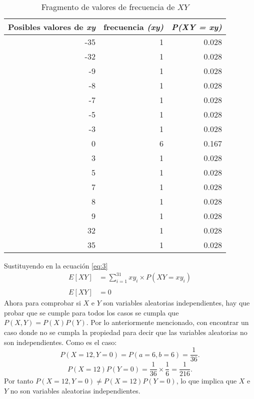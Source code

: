 \documentclass{article}
\begin{document}
\begin{table}[H]
  \centering
  \caption{Fragmento de valores de frecuencia de $XY$}
    \begin{tabular}{rrr}
    \toprule
    \multicolumn{1}{p{5.39em}}{\textbf{Posibles valores de \textit{\textbf{xy}}}} & \multicolumn{1}{l}{\textbf{frecuencia  \textit{\textbf{(xy)}}}}  & \multicolumn{1}{l}{\textit{\textbf{P(XY = xy)}}} \\
    \midrule
    -35   & 1     & 0.028 \\
    -32   & 1     & 0.028 \\
    -9    & 1     & 0.028 \\
    -8    & 1     & 0.028 \\
    -7    & 1     & 0.028 \\
    -5    & 1     & 0.028 \\
    -3    & 1     & 0.028 \\
    0     & 6     & 0.167 \\
    3     & 1     & 0.028 \\
    5     & 1     & 0.028 \\
    7     & 1     & 0.028 \\
    8     & 1     & 0.028 \\
    9     & 1     & 0.028 \\
    32    & 1     & 0.028 \\
    35    & 1     & 0.028 \\
    \bottomrule
    \end{tabular}%
  \label{tab:3}%
\end{table}%
Sustituyendo en la ecuación \ref{eq:3}
\begin{equation}
\begin{array}{ll}
   E[XY] &= \sum_{i=1}^{31} xy_{i}  \times P(XY=xy_{i})\\
   &\\
   E[XY] & = 0
  \end{array}
\end{equation}
Ahora para comprobar si $X$ e $Y$ son variables aleatorias independientes, hay que probar que se cumple para todos los casos se cumpla que $P(X,Y) = P(X)P(Y)$. Por lo anteriormente mencionado, con encontrar un caso donde no se cumpla la propiedad para decir que las variables aleatorias no son independientes. Como es el caso:
\begin{equation}
 P(X=12,Y=0) = P(a=6 , b=6) = \frac{1}{36} .  
\end{equation}
\begin{equation}
 P(X=12)P(Y=0) = \frac{1}{36} \times \frac{1}{6} = \frac{1}{216}.  
\end{equation}
Por tanto   $P(X=12,Y=0) \neq P(X=12)P(Y=0)$, lo que implica que $X$ e $Y$ no son variables aleatorias independientes.
\end{document}
